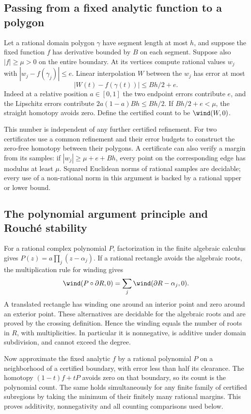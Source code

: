 \subsection{Passing from a fixed analytic function to a polygon}
Let a rational domain polygon $\gamma$ have segment length at most $h$,
and suppose the fixed function $f$ has derivative bounded by $B$ on
each segment. Suppose also $|f|\ge\mu>0$ on the entire boundary.
At its vertices compute rational values $w_j$ with
$|w_j-f(\gamma_j)|\le e$. Linear interpolation $W$ between the $w_j$
has error at most
\begin{equation}
 |W(t)-f(\gamma(t))|\le Bh/2+e.
 \label{eq:winding-interpolation}
\end{equation}
Indeed at a relative position $a\in[0,1]$ the two endpoint errors
contribute $e$, and the Lipschitz errors contribute
$2a(1-a)Bh\le Bh/2$. If $Bh/2+e<\mu$, the straight homotopy avoids
zero. Define the certified count to be $\wind(W,0)$.

This number is independent of any further certified refinement. For two
certificates use a common refinement and their error budgets to construct
the zero-free homotopy between their polygons. A certificate can also
verify a margin from its samples: if
$|w_j|\ge\mu+e+Bh$, every point on the corresponding edge has modulus
at least $\mu$. Squared Euclidean norms of rational samples are
decidable; every use of a non-rational norm in this argument is backed
by a rational upper or lower bound.

\subsection{The polynomial argument principle and Rouch\'e stability}
For a rational complex polynomial $P$, factorization in the finite
algebraic calculus gives
$P(z)=a\prod_j(z-\alpha_j)$. If a rational rectangle avoids the
algebraic roots, the multiplication rule for winding gives
\[
 \wind(P\circ\partial R,0)
 =\sum_j\wind(\partial R-\alpha_j,0).
\]
A translated rectangle has winding one around an interior point and
zero around an exterior point. These alternatives are decidable for
the algebraic roots and are proved by the crossing definition. Hence
the winding equals the number of roots in $R$, with multiplicities.
In particular it is nonnegative, is additive under domain subdivision,
and cannot exceed the degree.

Now approximate the fixed analytic $f$ by a rational polynomial $P$
on a neighborhood of a certified boundary, with error less than half
its clearance. The homotopy $(1-t)f+tP$ avoids zero on that boundary,
so its count is the polynomial count. The same holds simultaneously
for any finite family of certified subregions by taking the minimum
of their finitely many rational margins. This proves additivity,
nonnegativity and all counting comparisons used below.

